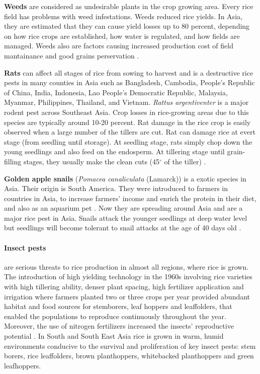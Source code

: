 \documentclass[12pt, oneside]{report}
\begin{document}
\textbf{Weeds} are considered as undesirable plants in the crop growing area. Every rice field has problems with weed infestations. Weeds reduced rice yields. In Asia, they are estimated that they can cause yield losses up to 80 percent, depending on how rice crops are established, how water is regulated, and how fields are managed. Weeds also are factors causing increased production cost of field mantainance and good grains perservation \citep{litsinger1991crop}.

\textbf{Rats} can affect all stages of rice from sowing to harvest and is a destructive rice pests in many counties in Asia such as Bangladesh, Cambodia, People's Republic of China, India, Indonesia, Lao People's Democratic Republic, Malaysia, Myanmar, Philippines, Thailand, and Vietnam. \textit{Rattus argentiventer} is a major rodent pest across Southeast Asia. Crop losses in rice-growing areas due to this species are typically around 10-20 percent. Rat damage in the rice crop is easily observed when a large number of the tillers are cut. Rat can damage rice at evert stage (from seedling until storage). At seedling stage, rats simply chop down the young seedlings and also feed on the endosperm. At tillering stage until grain-filling stages, they usually make the clean cuts (45$^{\circ}$ of the tiller) \citep{}. 

\textbf{Golden apple snails} (\textit{Pomacea canaliculata} (Lamarck)) is a exotic species in Asia. Their origin is South America. They were introduced to farmers in countries in Asia, to increase farmers' income and enrich the protein in their diet, and also as an aquarium pet \citep{joshi2007problems}. Now they are spreading around Asia and are a major rice pest in Asia. Snails attack the younger seedlings at deep water level but seedlings will become tolerant to snail attacks at the age of 40 days old \citep{sin2003damage}.

\paragraph{Insect pests} are serious threats to rice production in almost all regions, where rice is grown. The introduction of high yielding technology in the 1960s involving rice varieties with high tillering ability, denser plant spacing, high fertilizer application and irrigation where farmers planted two or three crops per year provided abundant habitat and food sources for stemborers, leaf hoppers and leaffolders, that enabled the populations to reproduce continuously throughout the year. Moreover, the use of nitrogen fertilizers increased the insects' reproductive potential \citep{bottrell2012resurrecting}. In South and South East Asia rice is grown in warm, humid environments conducive to the survival and proliferation of key insect pests: stem borers, rice leaffolders, brown planthoppers, whitebacked planthoppers and green leafhoppers.
\end{document}
